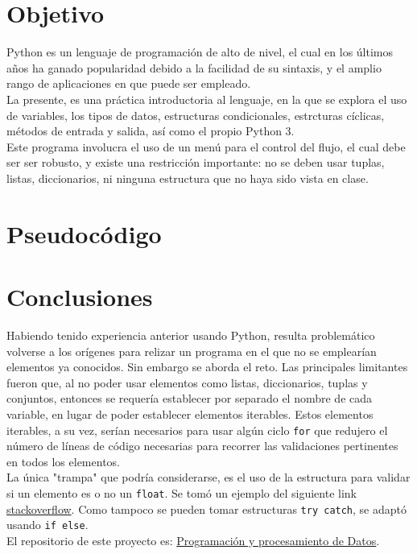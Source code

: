 \documentclass{assignment}
\begin{document}
	
	
	\section*{Objetivo}
	Python es un lenguaje de programación de alto de nivel, el cual en los últimos años ha ganado popularidad debido a la facilidad de su sintaxis, y el amplio rango de aplicaciones en que puede ser empleado.\\
		La presente, es una práctica introductoria al lenguaje, en la que se explora el uso de variables, los tipos de datos, estructuras condicionales, estrcturas cíclicas, métodos de entrada y salida, así como el propio Python 3.\\
		Este programa involucra el uso de un menú para el control del flujo, el cual debe ser ser robusto, y existe una restricción importante: no se deben usar tuplas, listas, diccionarios, ni ninguna estructura que no haya sido vista en clase.
	\section*{Pseudocódigo}
	
	\section*{Conclusiones}
	Habiendo tenido experiencia anterior usando Python, resulta problemático volverse a los orígenes para relizar un programa en el que no se emplearían elementos ya conocidos. Sin embargo se aborda el reto. Las principales limitantes fueron que, al no poder usar elementos como listas, diccionarios, tuplas y conjuntos, entonces se requería establecer por separado el nombre de cada variable, en lugar de poder establecer elementos iterables. Estos elementos iterables, a su vez, serían necesarios para usar algún ciclo {\tt for} que redujero el número de líneas de código necesarias para recorrer las validaciones pertinentes en todos los elementos.\\
	La única "trampa" que podría considerarse, es el uso de la estructura para validar si un elemento es o no un {\tt float}. Se tomó un ejemplo del siguiente link \href{https://stackoverflow.com/questions/35808484/how-to-check-if-a-string-represents-a-float-number}{stackoverflow}. Como tampoco se pueden tomar estructuras {\tt try catch}, se adaptó usando {\tt if else}.\\
	El repositorio de este proyecto es: \href{https://github.com/clivan/Programacion_y_Procesamiento_de_Datos_Infotec}{Programación y procesamiento de Datos}.
	
\end{document}
